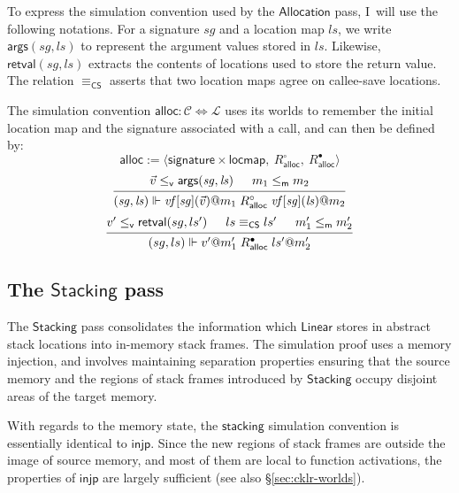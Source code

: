 \documentclass[11pt,oneside]{book}
\theoremstyle{definition}
\newcommand{\kw}[1]{\ensuremath{ \mathsf{#1} }}
\newcommand{\que}{\circ}         %
\newcommand{\ans}{\bullet}       %
\newcommand{\vref}{\le_\kw{v}}   %
\newcommand{\mext}{\le_\kw{m}}   %
\begin{document}
To express the simulation convention used by the \kw{Allocation} pass,
I~will use the following notations.
For a signature $\mathit{sg}$ and a location map $\mathit{ls}$,
we write $\kw{args}(\mathit{sg}, \mathit{ls})$
to represent the argument values stored in $\mathit{ls}$.
Likewise,
$\kw{retval}(\mathit{sg}, \mathit{ls})$ extracts
the contents of locations used to store the return value.
The relation $\equiv_\kw{CS}$ asserts that
two location maps agree on callee-save locations.

The simulation convention
$\kw{alloc} : \mathcal{C} \Leftrightarrow \mathcal{L}$
uses its worlds to remember the initial location map
and the signature associated with a call,
and can then be defined by:
\[
  \kw{alloc} := \langle
      \kw{signature} \times \kw{locmap}, \:
      R_\kw{alloc}^\que, \:
      R_\kw{alloc}^\ans \rangle
\]
\[
  \begin{prooftree}
  \hypo{\vec{v} \vref \kw{args}(\mathit{sg}, \mathit{ls})}
  \hypo{m_1 \mext m_2}
  \infer2{
      (\mathit{sg}, \mathit{ls}) \Vdash
      \mathit{vf}[\mathit{sg}](\vec{v})@m_1
      \mathrel{R_\kw{alloc}^\que}
      \mathit{vf}[\mathit{sg}](\mathit{ls})@m_2}
  \end{prooftree}
\]
\[
  \begin{prooftree}
  \hypo{v' \vref \kw{retval}(sg, ls')}
  \hypo{ls \equiv_\kw{CS} ls'}
  \hypo{m_1' \mext m_2'}
  \infer3{
      (sg, ls) \Vdash
      v'@m_1'
      \mathrel{R_\kw{alloc}^\ans}
      ls'@m_2'}
  \end{prooftree}
\]


\subsection{The \kw{Stacking} pass} \label{sec:stacking} %

The \kw{Stacking} pass
consolidates the information which
\kw{Linear} stores in abstract stack locations
into in-memory stack frames.
The simulation proof uses a memory injection,
and involves maintaining separation properties
ensuring that the source memory and
the regions of stack frames
introduced by \kw{Stacking}
occupy disjoint areas of the target memory.

With regards to the memory state,
the \kw{stacking} simulation convention
is essentially identical to \kw{injp}.
Since the new regions of stack frames
are outside the image of source memory,
and most of them are local to
function activations,
the properties of \kw{injp}
are largely sufficient
(see also \S\ref{sec:cklr-worlds}).
\end{document}
